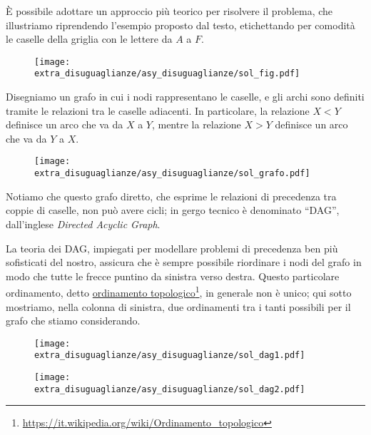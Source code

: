 \SolDAG

È possibile adottare un approccio più teorico per risolvere il problema, che illustriamo riprendendo l'esempio proposto dal testo, etichettando per comodità le caselle della griglia con le lettere da $A$ a $F$.
	
	\vspace{-1mm}
	\begin{figure}[h]
		\centering\texttt{[image: extra\_disuguaglianze/asy\_disuguaglianze/sol\_fig.pdf]}
	\end{figure}

Disegniamo un grafo in cui i nodi rappresentano le caselle, e gli archi sono definiti tramite le relazioni tra le caselle adiacenti. In particolare, la relazione $X < Y$ definisce un arco che va da $X$ a $Y$, mentre la relazione $X > Y$ definisce un arco che va da $Y$ a $X$.

\begin{figure}[H]
\centering\texttt{[image: extra\_disuguaglianze/asy\_disuguaglianze/sol\_grafo.pdf]}
\end{figure}

Notiamo che questo grafo diretto, che esprime le relazioni di precedenza tra coppie di caselle, non può avere cicli; in gergo tecnico è denominato ``DAG'', dall'inglese \textit{Directed Acyclic Graph}.

La teoria dei DAG, impiegati per modellare problemi di precedenza ben più sofisticati del nostro, assicura che è sempre possibile riordinare i nodi del grafo in modo che tutte le frecce puntino da sinistra verso destra. Questo particolare ordinamento, detto \href{https://it.wikipedia.org/wiki/Ordinamento_topologico}{ordinamento topologico}\footnote{\url{https://it.wikipedia.org/wiki/Ordinamento_topologico}}, in generale non è unico; qui sotto mostriamo, nella colonna di sinistra, due ordinamenti tra i tanti possibili per il grafo che stiamo considerando.

\begin{figure}[H]
\centering\texttt{[image: extra\_disuguaglianze/asy\_disuguaglianze/sol\_dag1.pdf]}\hspace{1.5cm}
\end{figure}
\begin{figure}[H]
\centering\texttt{[image: extra\_disuguaglianze/asy\_disuguaglianze/sol\_dag2.pdf]}\hspace{1.5cm}
\end{figure}

